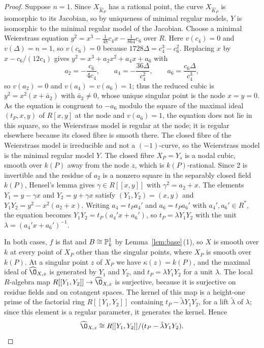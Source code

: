 \begin{proof}
Suppose $n = 1$.
Since $X_{\widehat K_P}$ has a rational point, the curve $X_{\widehat K_P}$ is isomorphic to its Jacobian, so by uniqueness of minimal regular models, $Y$ is isomorphic to the minimal regular model of the Jacobian.
Choose a minimal Weierstrass equation $y^2 = x^3-\tfrac{1}{48}c_4x-\tfrac{1}{864}c_6$ over $R$.
Here $v(c_4) = 0$ and $v(\Delta) = n = 1$, so $v(c_6) = 0$ because $1728\Delta = c_4^3-c_6^2$.
Replacing $x$ by $x-c_6/(12c_4)$ gives $y^2 = x^3+a_2x^2+a_4x+a_6$ with
\[
  a_2 = -\frac{c_6}{4c_4},\qquad a_4 = -\frac{36\Delta}{c_4^2},\qquad a_6 = \frac{c_6\Delta}{c_4^3},
\]
so $v(a_2) = 0$ and $v(a_4) = v(a_6) = 1$; thus the reduced cubic is $y^2 = x^2(x+\bar a_2)$ with $\bar a_2\neq 0$, whose unique singular point is the node $x = y = 0$.
As the equation is congruent to $-a_6$ modulo the square of the maximal ideal $(t_P,x,y)$ of $R[x,y]$ at the node and $v(a_6) = 1$, the equation does not lie in this square, so the Weierstrass model is regular at the node; it is regular elsewhere because its closed fibre is smooth there.
The closed fibre of the Weierstrass model is irreducible and not a $(-1)$-curve, so the Weierstrass model is the minimal regular model $Y$.
The closed fibre $X_P = Y_s$ is a nodal cubic, smooth over $k(P)$ away from the node $z$, which is $k(P)$-rational.
Since $2$ is invertible and the residue of $a_2$ is a nonzero square in the separably closed field $k(P)$, Hensel's lemma gives $\gamma\in R[[x,y]]$ with $\gamma^2 = a_2+x$.
The elements $Y_1 = y-\gamma x$ and $Y_2 = y+\gamma x$ satisfy $(Y_1,Y_2) = (x,y)$ and $Y_1Y_2 = y^2-x^2(a_2+x)$.
Writing $a_4 = t_Pa_4'$ and $a_6 = t_Pa_6'$ with $a_4',a_6'\in R^*$, the equation becomes $Y_1Y_2 = t_P(a_4'x+a_6')$, so $t_P = \lambda Y_1Y_2$ with the unit $\lambda = (a_4'x+a_6')^{-1}$.

In both cases, $f$ is flat and $B\cong\mathbb{P}^1_k$ by Lemma~\ref{lem:base}\,(1), so $X$ is smooth over $k$ at every point of $X_P$ other than the singular points, where $X_P$ is smooth over $k(P)$.
At a singular point $z$ of $X_P$ we have $\kappa(z) = k(P)$, and the maximal ideal of $\widehat\O_{X,z}$ is generated by $Y_1$ and $Y_2$, and $t_P = \lambda Y_1Y_2$ for a unit $\lambda$.
The local $R$-algebra map $R[[Y_1,Y_2]]\to\widehat\O_{X,z}$ is surjective, because it is surjective on residue fields and on cotangent spaces.
The kernel of this map is a height-one prime of the factorial ring $R[[Y_1,Y_2]]$ containing $t_P-\tilde\lambda Y_1Y_2$, for a lift $\tilde\lambda$ of $\lambda$; since this element is a regular parameter, it generates the kernel.
Hence
\begin{equation}\label{eq:node}
  \widehat\O_{X,z}\cong R[[Y_1,Y_2]]/(t_P-\tilde\lambda Y_1Y_2).
\end{equation}


\end{proof}
